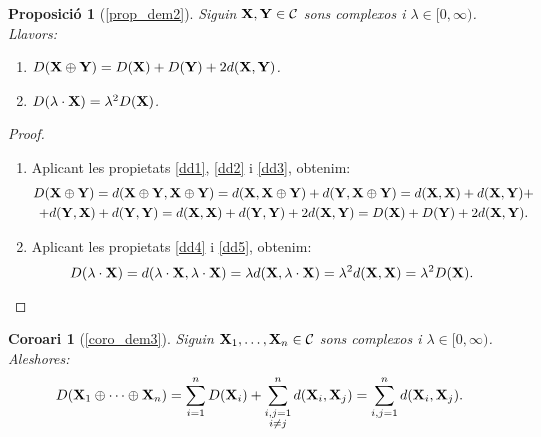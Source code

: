 \documentclass{article}
\theoremstyle{math}
\theoremstyle{TheoremNum}
\newtheorem{prop*}[definition]{Proposició}
\newtheorem{corollary*}[definition]{Coro\lgem ari}
\newcommand{\0}{\ensuremath{\vb{0}}}
\newcommand{\X}{\ensuremath{\vb{X}}}
\newcommand{\Y}{\ensuremath{\vb{Y}}}
\begin{document}
\begin{prop*}[\ref*{prop_dem2}]
  Siguin $\X,\Y\in\mathcal{C}$ sons complexos i $\lambda\in[0,\infty)$. Llavors:
  \begin{enumerate}[label=$D$\arabic*),ref=$D$\arabic*]
    \item\label{DD1} $D(\X\oplus\Y)=D(\X)+D(\Y)+2d(\X,\Y)$.
    \item\label{DD2} $D(\lambda\cdot \X)=\lambda^2D(\X)$.
  \end{enumerate}
\end{prop*}
\begin{proof}
  \hfill
  \begin{enumerate}[label=$D$\arabic*)]
    \item Aplicant les propietats \ref{dd1}, \ref{dd2} i \ref{dd3}, obtenim:
          \begin{multline*}
            D(\X\oplus\Y)=d(\X\oplus\Y,\X\oplus\Y)=d(\X,\X\oplus\Y)+d(\Y,\X\oplus\Y)=d(\X,\X)+d(\X,\Y)+\\+d(\Y,\X)+d(\Y,\Y)=d(\X,\X)+d(\Y,\Y)+2d(\X,\Y)=D(\X)+D(\Y)+2d(\X,\Y).
          \end{multline*}
    \item Aplicant les propietats \ref{dd4} i \ref{dd5}, obtenim: $$D(\lambda\cdot\X)=d(\lambda\cdot\X,\lambda\cdot\X)=\lambda d(\X,\lambda\cdot\X)=\lambda^2d(\X,\X)=\lambda^2D(\X).$$
  \end{enumerate}
\end{proof}
\begin{corollary*}[\ref*{coro_dem3}]
  Siguin $\X_1,\ldots,\X_n\in\mathcal{C}$ sons complexos i $\lambda\in[0,\infty)$. Aleshores: $$D(\X_1\oplus\cdots\oplus\X_n)=\sum_{i=1}^nD(\X_i)+\sum_{\substack{i,j=1\\i\ne j}}^nd(\X_i,\X_j)=\sum_{i,j=1}^nd(\X_i,\X_j).$$
\end{corollary*}
\end{document}
